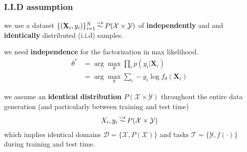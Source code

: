 \documentclass[11pt]{beamer}
\begin{document}
	
	\begin{frame}
		\frametitle{I.I.D assumption}
		
		we use a dataset $\{(\mathbf{X}_i,y_i)\}_{i=1}^N \iidsim P(\mathcal{X} \times \mathcal{Y})$ of \textbf{independently} and and \textbf{identically} distributed (i.i.d) samples.
		\vspace{1em}
		
		\pause
		we need \textbf{independence} for the factorization in max likelihood.
		\begin{align*}
		\theta^\ast &= \arg\max_\theta \prod_{i} p(y_i \vert \mathbf{X}_i)  \\
		&= \arg\max_\theta \sum_{i} -y_i \log f_\theta(\mathbf{X}_i)
		\end{align*}
		
		\pause
		we assume an \textbf{identical distribution} $P(\mathcal{X} \times \mathcal{Y})$ throughout the entire data generation { \scriptsize (and particularly between training and test time) }
		\begin{align}
		X_i,y_i \iidsim P(\mathcal{X} \times \mathcal{Y})
		\end{align}
		which implies identical domains $\mathcal{D} = \{\mathcal{X}, P(\mathcal{X})\}$ and tasks $\mathcal{T} = \{\mathcal{Y}, f(\cdot)\}$ during training and test time.
		
	\end{frame}
\end{document}
